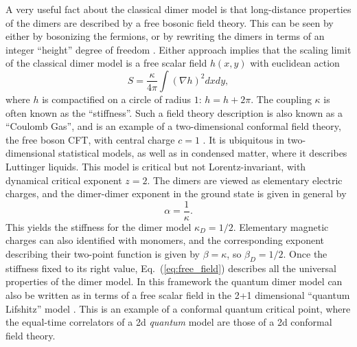 \documentclass[11pt]{iopart}
\begin{document}

A very useful fact about the classical dimer model is that long-distance properties of the dimers are described by a free bosonic field theory. This can be seen by either by bosonizing the fermions, or by rewriting the dimers in terms of an integer ``height'' degree of freedom \cite{Heights_1,Heights_2,Henley}. Either approach implies that the scaling limit of the classical dimer model is a free scalar field $h(x,y)$ with euclidean action
 \begin{equation}\label{eq:free_field}
  S=\frac{\kappa}{4\pi}\int \left(\nabla h\right)^2 dx dy,
 \end{equation}
 where $h$ is compactified on a circle of radius $1$: $h=h+2\pi$. The coupling $\kappa$ is often known as the ``stiffness''. Such a field theory description is also known as a ``Coulomb Gas'', and is an example of a two-dimensional conformal field theory, the free boson CFT, with central charge $c=1$ \cite{Nienhuis,Ginsparg}. It is ubiquitous in two-dimensional statistical models, as well as in condensed matter, where it describes Luttinger liquids.   This model is critical but not Lorentz-invariant, with dynamical critical exponent $z=2$.  The dimers are viewed as elementary electric charges, and the dimer-dimer exponent in the ground state is given in general by
\begin{equation}
 \alpha=\frac{1}{\kappa}.
\end{equation}
This yields the stiffness for the dimer model $\kappa_D=1/2$. Elementary magnetic charges can also identified with monomers, and the corresponding exponent describing their two-point function is given by $\beta=\kappa$, so $\beta_D=1/2$.
Once the stiffness fixed to its right value, Eq.~(\ref{eq:free_field}) describes all the universal properties of the dimer model.
In this framework the quantum dimer model can also be written as in terms of a free scalar field in the 2+1 dimensional ``quantum Lifshitz'' model \cite{Henley,Fradkin_dimers}. This is an example of a conformal quantum critical point, where the equal-time correlators of a 2d {\em quantum} model are those of a 2d conformal field theory.
\end{document}
